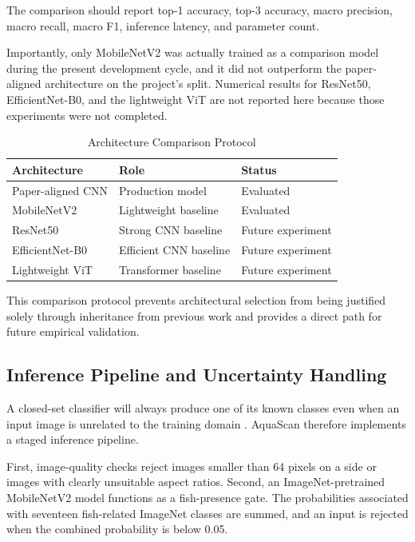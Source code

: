 \documentclass[conference]{IEEEtran}
\begin{document}
The comparison should report top-1 accuracy, top-3 accuracy, macro precision, macro recall, macro F1, inference latency, and parameter count.

Importantly, only MobileNetV2 \cite{b7} was actually trained as a comparison model during the present development cycle, and it did not outperform the paper-aligned architecture on the project's split. Numerical results for ResNet50, EfficientNet-B0, and the lightweight ViT are not reported here because those experiments were not completed.

\begin{table}[!t]
\caption{Architecture Comparison Protocol}
\centering
\scriptsize
\begin{tabular}{l l l}
\toprule
\textbf{Architecture} & \textbf{Role} & \textbf{Status}\\
\midrule
Paper-aligned CNN \cite{b1} & Production model & Evaluated\\
MobileNetV2 \cite{b7} & Lightweight baseline & Evaluated\\
ResNet50 \cite{b8} & Strong CNN baseline & Future experiment\\
EfficientNet-B0 \cite{b9} & Efficient CNN baseline & Future experiment\\
Lightweight ViT \cite{b10} & Transformer baseline & Future experiment\\
\bottomrule
\end{tabular}
\label{tab:baselines}
\end{table}

This comparison protocol prevents architectural selection from being justified solely through inheritance from previous work and provides a direct path for future empirical validation.

\subsection{Inference Pipeline and Uncertainty Handling}

A closed-set classifier will always produce one of its known classes even when an input image is unrelated to the training domain \cite{b25}. AquaScan therefore implements a staged inference pipeline.

First, image-quality checks reject images smaller than 64 pixels on a side or images with clearly unsuitable aspect ratios. Second, an ImageNet-pretrained \cite{b26} MobileNetV2 model \cite{b7} functions as a fish-presence gate. The probabilities associated with seventeen fish-related ImageNet classes are summed, and an input is rejected when the combined probability is below 0.05.
\end{document}

